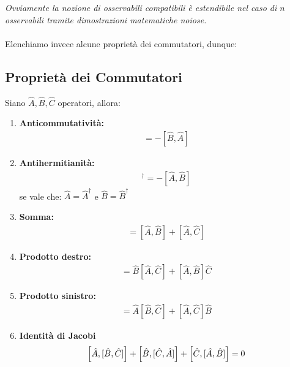 	\textit{Ovviamente la nozione di osservabili compatibili è estendibile nel caso di $n$ osservabili tramite dimostrazioni matematiche noiose.}
	\\
	\\
	Elenchiamo invece alcune proprietà dei commutatori, dunque:
	
\subsection{Proprietà dei Commutatori}
	
	Siano $\hat{A}, \hat{B}, \hat{C}$ operatori, allora:

\begin{enumerate}[label=\arabic*)]
	\item \textbf{Anticommutatività:}
	\begin{align*}
		[\hat{A}, \hat{B}] = - [\hat{B}, \hat{A}]
	\end{align*}
	
	\item \textbf{Antihermitianità:}
	\begin{align*}
		[\hat{A}, \hat{B}]^{\dagger} = - [\hat{A}, \hat{B}]
	\end{align*}
		se vale che: $\hat{A} = \hat{A}^{\dagger}$ e $\hat{B} = \hat{B}^{\dagger}$
	
	\item \textbf{Somma:}
	\begin{align*}
		[\hat{A}, \hat{B}+\hat{C}] = [\hat{A}, \hat{B}] + [\hat{A}, \hat{C}]
	\end{align*}
	
	\item \textbf{Prodotto destro:}
	\begin{align*}
		[\hat{A}, \hat{B}\hat{C}] = \hat{B} [\hat{A}, \hat{C}] + [\hat{A}, \hat{B}] \hat{C}
	\end{align*}
	
	\item \textbf{Prodotto sinistro:}
	\begin{align*}
		[\hat{A}\hat{B}, \hat{C}] = \hat{A} [\hat{B}, \hat{C}] + [\hat{A}, \hat{C}] \hat{B}
	\end{align*}
	
	\item \textbf{Identità di Jacobi}
	\begin{align*}
		\qty[\hat{A}, [\hat{B}, \hat{C}]] + \qty[\hat{B}, [\hat{C}, \hat{A}]] + \qty[\hat{C}, [\hat{A}, \hat{B}]] = 0
	\end{align*}
\end{enumerate}

